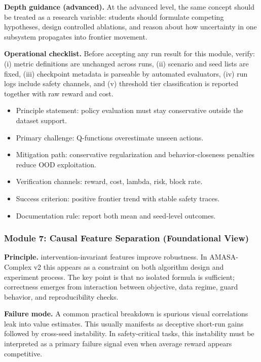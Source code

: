 \documentclass[conference]{IEEEtran}
\begin{document}
\textbf{Depth guidance (advanced).} At the advanced level, the same concept should be treated as a research variable: students should formulate competing hypotheses, design controlled ablations, and reason about how uncertainty in one subsystem propagates into frontier movement.

\textbf{Operational checklist.} Before accepting any run result for this module, verify: (i) metric definitions are unchanged across runs, (ii) scenario and seed lists are fixed, (iii) checkpoint metadata is parseable by automated evaluators, (iv) run logs include safety channels, and (v) threshold tier classification is reported together with raw reward and cost.

\begin{itemize}[leftmargin=*]
  \item Principle statement: policy evaluation must stay conservative outside the dataset support.
  \item Primary challenge: Q-functions overestimate unseen actions.
  \item Mitigation path: conservative regularization and behavior-closeness penalties reduce OOD exploitation.
  \item Verification channels: reward, cost, lambda, risk, block rate.
  \item Success criterion: positive frontier trend with stable safety traces.
  \item Documentation rule: report both mean and seed-level outcomes.
\end{itemize}


\subsubsection{Module 7: Causal Feature Separation (Foundational View)}
\textbf{Principle.} intervention-invariant features improve robustness. In AMASA-Complex v2 this appears as a constraint on both algorithm design and experiment process. The key point is that no isolated formula is sufficient; correctness emerges from interaction between objective, data regime, guard behavior, and reproducibility checks.

\textbf{Failure mode.} A common practical breakdown is spurious visual correlations leak into value estimates. This usually manifests as deceptive short-run gains followed by cross-seed instability. In safety-critical tasks, this instability must be interpreted as a primary failure signal even when average reward appears competitive.
\end{document}
